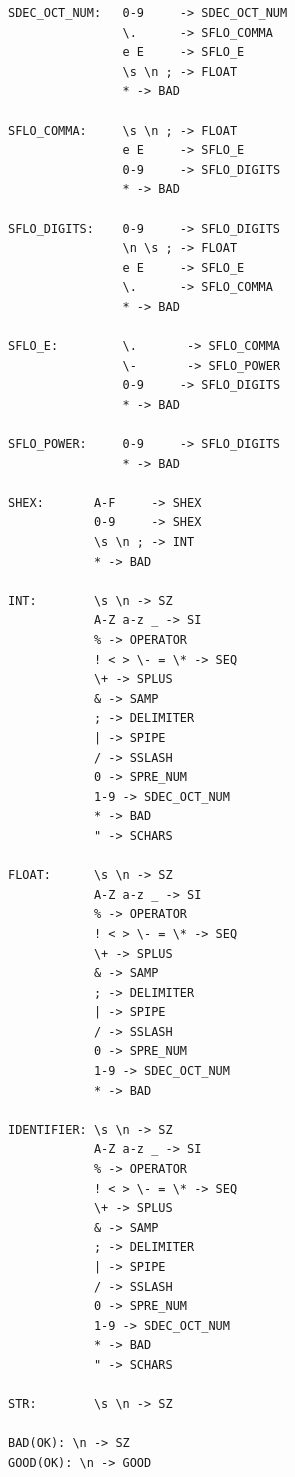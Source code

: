 \documentclass[14pt]{extarticle}
\begin{document}
\begin{lstlisting}
SDEC_OCT_NUM:   0-9     -> SDEC_OCT_NUM
                \.      -> SFLO_COMMA
                e E     -> SFLO_E
                \s \n ; -> FLOAT
                * -> BAD

SFLO_COMMA:     \s \n ; -> FLOAT
                e E     -> SFLO_E
                0-9     -> SFLO_DIGITS
                * -> BAD

SFLO_DIGITS:    0-9     -> SFLO_DIGITS
                \n \s ; -> FLOAT
                e E     -> SFLO_E
                \.      -> SFLO_COMMA
                * -> BAD

SFLO_E:         \.       -> SFLO_COMMA
                \-       -> SFLO_POWER 
                0-9     -> SFLO_DIGITS
                * -> BAD

SFLO_POWER:     0-9     -> SFLO_DIGITS
                * -> BAD
    
SHEX:       A-F     -> SHEX
            0-9     -> SHEX
            \s \n ; -> INT
            * -> BAD

INT:        \s \n -> SZ
            A-Z a-z _ -> SI
            % -> OPERATOR
            ! < > \- = \* -> SEQ
            \+ -> SPLUS
            & -> SAMP
            ; -> DELIMITER
            | -> SPIPE
            / -> SSLASH
            0 -> SPRE_NUM
            1-9 -> SDEC_OCT_NUM
            * -> BAD
            " -> SCHARS

FLOAT:      \s \n -> SZ
            A-Z a-z _ -> SI
            % -> OPERATOR
            ! < > \- = \* -> SEQ
            \+ -> SPLUS
            & -> SAMP
            ; -> DELIMITER
            | -> SPIPE
            / -> SSLASH
            0 -> SPRE_NUM
            1-9 -> SDEC_OCT_NUM
            * -> BAD
    
IDENTIFIER: \s \n -> SZ
            A-Z a-z _ -> SI
            % -> OPERATOR
            ! < > \- = \* -> SEQ
            \+ -> SPLUS
            & -> SAMP
            ; -> DELIMITER
            | -> SPIPE
            / -> SSLASH
            0 -> SPRE_NUM
            1-9 -> SDEC_OCT_NUM
            * -> BAD
            " -> SCHARS

STR:        \s \n -> SZ
    
BAD(OK): \n -> SZ
GOOD(OK): \n -> GOOD

    \end{lstlisting}
\end{document}
